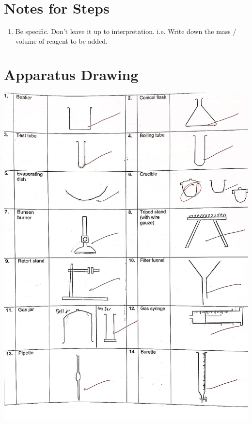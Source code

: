 \documentclass[oneside]{book}
\begin{document}
\section{Notes for Steps}
\begin{enumerate}
    \item Be specific. Don't leave it up to interpretation. i.e. Write down the mass / volume of reagent to be added.
\end{enumerate}
{\section{Apparatus Drawing}
\begin{center}
    \includegraphics[width=\textwidth,height=\textheight,keepaspectratio]{images/39FFEC3F-8CED-48DC-A3E6-553D6CE7B4F8.jpeg}\\

\end{center}}
\end{document}
